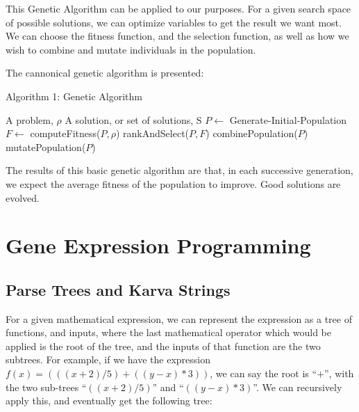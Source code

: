 \documentclass[a4paper,11pt]{report}
\begin{document}
This Genetic Algorithm can be applied to our purposes. For a given search space of possible solutions, 
we can optimize variables to get the result we want most. We can choose the fitness function, and the selection 
function, as well as how we wish to combine and mutate individuals in the population. 

The cannonical genetic algorithm is presented:

\begin{algorithm}
\caption{Algorithm 1: Genetic Algorithm}
\renewcommand{\algorithmicrequire}{\textbf{Input:}}
\renewcommand{\algorithmicensure}{\textbf{Output:}}
\begin{algorithmic}[1]
\REQUIRE A problem, $\rho$
\ENSURE A solution, or set of solutions, S
\STATE $P \leftarrow$ Generate-Initial-Population
  \STATE $F \leftarrow $ computeFitness($P, \rho$)
  \STATE rankAndSelect($P, F$)
  \STATE combinePopulation($P$)
  \STATE mutatePopulation($P$)
\ENDWHILE

\end{algorithmic}
\end{algorithm}  

The results of this basic genetic algorithm are that, in each successive generation, we expect the average
fitness of the population to improve. Good solutions are evolved. 


\section{Gene Expression Programming}

\subsection{Parse Trees and Karva Strings}
For a given mathematical expression, we can represent the expression as a tree of functions, and inputs, 
where the last mathematical operator which would be applied is the root of the tree, and the 
inputs of that function are the two subtrees. For example, if 
we have the expression $f(x) = (((x+2)/5) + ((y-x) * 3))$, we can say the root is ``$+$'', with the 
two sub-trees ``$((x+2)/5)$'' and ``$((y-x) * 3)$''. We can recursively apply this, and eventually get 
the following tree: \\[0.8cm]
\end{document}
